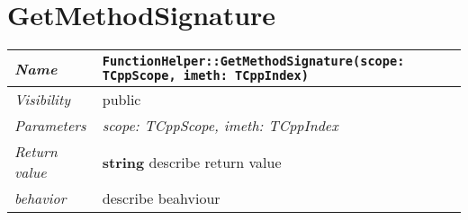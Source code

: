  \section{GetMethodSignature}
\begin{longtable}{p{3cm} @{\hskip 1cm} p{12cm}}
 \hline
\textit{Name} & \texttt{FunctionHelper::GetMethodSignature(scope: TCppScope, imeth: TCppIndex)}\\
\hline
 \textit{Visibility} & public\\
\hline
\textit{Parameters} & \textit{scope: TCppScope, imeth: TCppIndex}\\
\hline
\textit{Return value} & \textbf{ string} describe return value\\
  \hline
 \textit{behavior} & describe beahviour \\
\hline
\end{longtable} \pagebreak
 